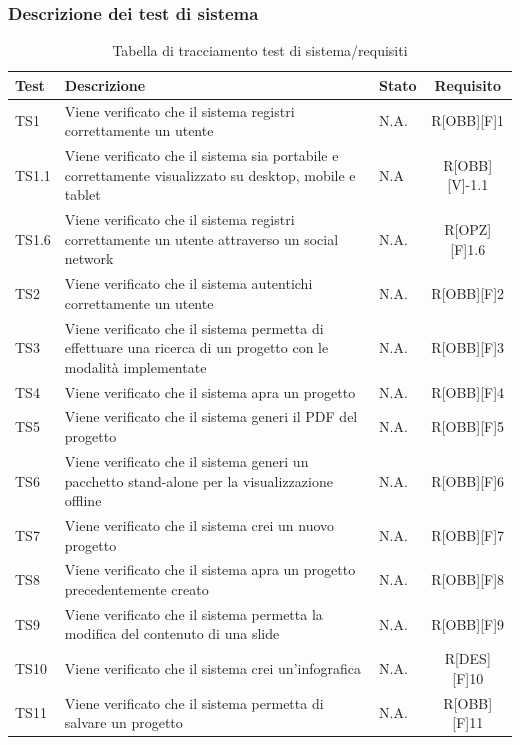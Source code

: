 \subsubsection{Descrizione dei test di sistema}
\begin{center}
	\begin{table}[h]
		\begin{tabular}{|l|p{}|l|c|}
			\toprule
			
			\textbf{Test} & \textbf{Descrizione} & \textbf{Stato} & \textbf{Requisito} \\
			
			\midrule
			TS1 & Viene verificato che il sistema registri correttamente un utente & N.A. & R[OBB][F]1\\ \midrule
			TS1.1 & Viene verificato che il sistema sia portabile e correttamente visualizzato su desktop, mobile e tablet & N.A & R[OBB][V]-1.1 \\ \midrule
			TS1.6 & Viene verificato che il sistema registri correttamente un utente attraverso un social network & N.A. & R[OPZ][F]1.6\\ \midrule
			TS2 & Viene verificato che il sistema autentichi correttamente un utente & N.A. & R[OBB][F]2\\  \midrule
			TS3	& Viene verificato che il sistema permetta di effettuare una ricerca di un progetto con le modalità implementate & N.A. & R[OBB][F]3\\ \midrule
			TS4	& Viene verificato che il sistema apra un progetto & N.A. & R[OBB][F]4\\ \midrule
			TS5 & Viene verificato che il sistema generi il PDF del progetto & N.A. & R[OBB][F]5\\ \midrule
			TS6 & Viene verificato che il sistema generi un pacchetto stand-alone per la visualizzazione offline & N.A. & R[OBB][F]6\\ \midrule
			TS7 & Viene verificato che il sistema crei un nuovo progetto & N.A. & R[OBB][F]7\\ \midrule
			TS8 & Viene verificato che il sistema apra un progetto precedentemente creato & N.A. & R[OBB][F]8\\ \midrule
			TS9 & Viene verificato che il sistema permetta la modifica del contenuto di una \gls{slide} & N.A. & R[OBB][F]9\\ \midrule
			TS10 & Viene verificato che il sistema crei un'\gls{infografica} & N.A. & R[DES][F]10\\ \midrule
			TS11 & Viene verificato che il sistema permetta di salvare un progetto & N.A. & R[OBB][F]11\\
			
						
			\bottomrule
			
		\end{tabular}
		\caption{Tabella di tracciamento test di sistema/requisiti}
		
	\end{table}
	
\end{center}

